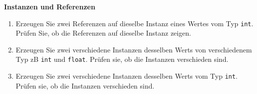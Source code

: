 \textbf{Instanzen und Referenzen}
\begin{enumerate}
	\item Erzeugen Sie zwei Referenzen auf dieselbe Instanz eines Wertes vom Typ \verb|int|. Prüfen Sie, ob die Referenzen auf dieselbe Instanz zeigen.
	\item Erzeugen Sie zwei verschiedene Instanzen desselben Werts von verschiedenem Typ zB \verb|int| und \verb|float|. Prüfen sie, ob die Instanzen verschieden sind.
	\item Erzeugen Sie zwei verschiedene Instanzen desselben Werts vom Typ \verb|int|. Prüfen sie, ob die Instanzen verschieden sind.
\end{enumerate}
